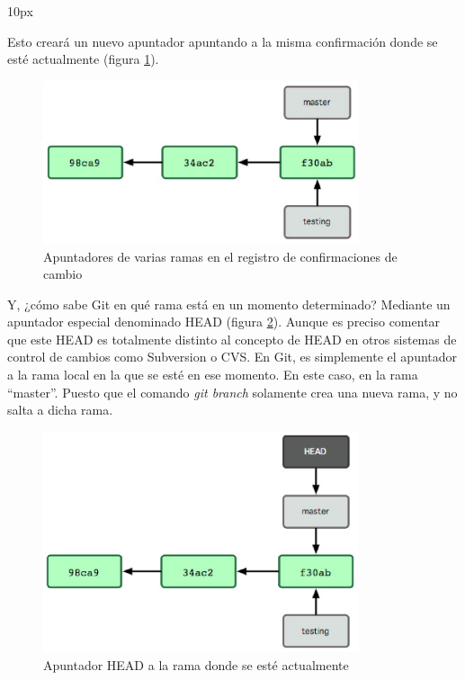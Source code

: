 \begin{center}{
	\fboxsep 10px
	}
\end{center}

Esto creará un nuevo apuntador apuntando a la misma confirmación donde se esté actualmente (figura \ref{fig:ramas_apuntadores_varias}).

\begin{figure}
  \centering
    \includegraphics[width=350px]{./eps/git/git_apuntador_varias_ramas.eps}
  \caption{Apuntadores de varias ramas en el registro de confirmaciones de cambio}
  \label{fig:ramas_apuntadores_varias}
\end{figure}

Y, ¿cómo sabe Git en qué rama está en un momento determinado? Mediante un apuntador especial denominado HEAD (figura \ref{fig:ramas_apuntadores_head}). Aunque es preciso comentar que este HEAD es totalmente distinto al concepto de HEAD en otros sistemas de control de cambios como Subversion o CVS. En Git, es simplemente el apuntador a la rama local en la que se esté en ese momento. En este caso, en la rama ``master''. Puesto que el comando {\it git branch} solamente crea una nueva rama, y no salta a dicha rama.

\begin{figure}
  \centering
    \includegraphics[width=350px]{./eps/git/git_apuntador_head.eps}
  \caption{Apuntador HEAD a la rama donde se esté actualmente}
  \label{fig:ramas_apuntadores_head}
\end{figure}

